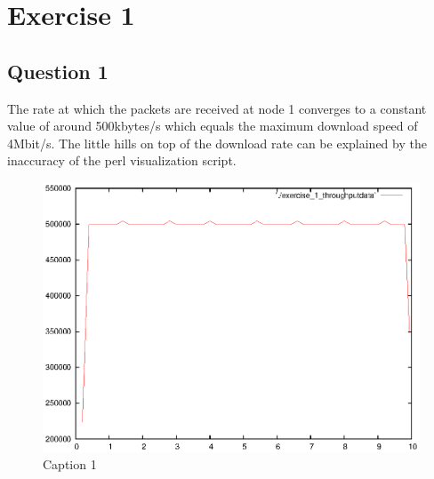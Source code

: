 \documentclass[12pt]{article}
\begin{document}
\section*{Exercise 1}

\subsection*{Question 1}
The rate at which the packets are received at node 1 converges to a constant value of around 500kbytes/s which equals the maximum download speed of 4Mbit/s. The little hills on top of the download rate can be explained by the inaccuracy of the perl visualization script.
\begin{figure}[h]
\centerline{\includegraphics{pictures/E1Q1.eps}}
\caption{Caption 1}
\label{fig:question1}
\end{figure}
\end{document}
